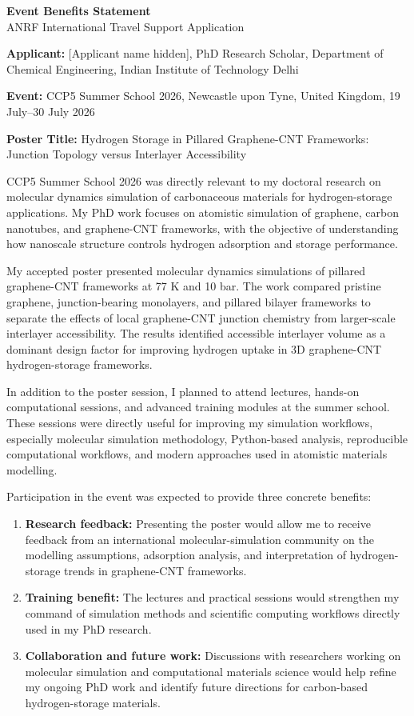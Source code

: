 \documentclass[11pt,a4paper]{article}
\begin{document}
\begin{center}
{\Large \textbf{Event Benefits Statement}}\\
{\large ANRF International Travel Support Application}\\[0.5em]
\end{center}

\textbf{Applicant:} [Applicant name hidden], PhD Research Scholar, Department of Chemical Engineering, Indian Institute of Technology Delhi

\textbf{Event:} CCP5 Summer School 2026, Newcastle upon Tyne, United Kingdom, 19 July--30 July 2026

\textbf{Poster Title:} Hydrogen Storage in Pillared Graphene-CNT Frameworks: Junction Topology versus Interlayer Accessibility

CCP5 Summer School 2026 was directly relevant to my doctoral research on molecular dynamics simulation of carbonaceous materials for hydrogen-storage applications. My PhD work focuses on atomistic simulation of graphene, carbon nanotubes, and graphene-CNT frameworks, with the objective of understanding how nanoscale structure controls hydrogen adsorption and storage performance.

My accepted poster presented molecular dynamics simulations of pillared graphene-CNT frameworks at 77 K and 10 bar. The work compared pristine graphene, junction-bearing monolayers, and pillared bilayer frameworks to separate the effects of local graphene-CNT junction chemistry from larger-scale interlayer accessibility. The results identified accessible interlayer volume as a dominant design factor for improving hydrogen uptake in 3D graphene-CNT hydrogen-storage frameworks.

In addition to the poster session, I planned to attend lectures, hands-on computational sessions, and advanced training modules at the summer school. These sessions were directly useful for improving my simulation workflows, especially molecular simulation methodology, Python-based analysis, reproducible computational workflows, and modern approaches used in atomistic materials modelling.

Participation in the event was expected to provide three concrete benefits:

\begin{enumerate}
  \item \textbf{Research feedback:} Presenting the poster would allow me to receive feedback from an international molecular-simulation community on the modelling assumptions, adsorption analysis, and interpretation of hydrogen-storage trends in graphene-CNT frameworks.
  \item \textbf{Training benefit:} The lectures and practical sessions would strengthen my command of simulation methods and scientific computing workflows directly used in my PhD research.
  \item \textbf{Collaboration and future work:} Discussions with researchers working on molecular simulation and computational materials science would help refine my ongoing PhD work and identify future directions for carbon-based hydrogen-storage materials.
\end{enumerate}
\end{document}
